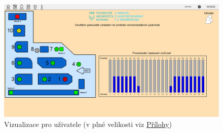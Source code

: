 \begin{figure}[H]
    \centering\includegraphics[width=\textwidth]{Figures/Promotic_uzivatel_vizualizace.png} 
    \caption{Vizualizace pro uživatele (v plné velikosti viz \hyperref[Sec-Prilohy]{Přílohy})}
    \label{Obr-Viz_uziv}
\end{figure}


\endinput
